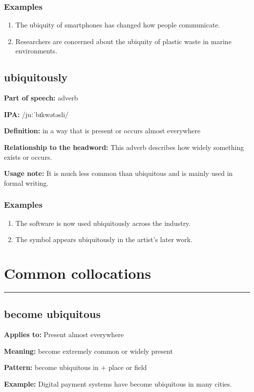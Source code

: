 \documentclass[11pt]{article}
\newcommand{\sectionrule}{\par\vspace{-0.5em}\noindent\textcolor{Accent}{\rule{\linewidth}{0.6pt}}\par}
\begin{document}
\subsubsection{Examples}
\begin{enumerate}
  \item The ubiquity of smartphones has changed how people communicate.
  \item Researchers are concerned about the ubiquity of plastic waste in marine environments.
\end{enumerate}

\subsection{ubiquitously}
\textbf{Part of speech:} adverb

\textbf{IPA:} /juːˈbɪkwətəsli/

\textbf{Definition:} in a way that is present or occurs almost everywhere

\textbf{Relationship to the headword:} This adverb describes how widely something exists or occurs.

\textbf{Usage note:} It is much less common than ubiquitous and is mainly used in formal writing.

\subsubsection{Examples}
\begin{enumerate}
  \item The software is now used ubiquitously across the industry.
  \item The symbol appears ubiquitously in the artist's later work.
\end{enumerate}

\section{Common collocations}
\sectionrule
\subsection{become ubiquitous}
\textbf{Applies to:} Present almost everywhere

\textbf{Meaning:} become extremely common or widely present

\textbf{Pattern:} become ubiquitous in + place or field

\textbf{Example:} Digital payment systems have become ubiquitous in many cities.
\end{document}
